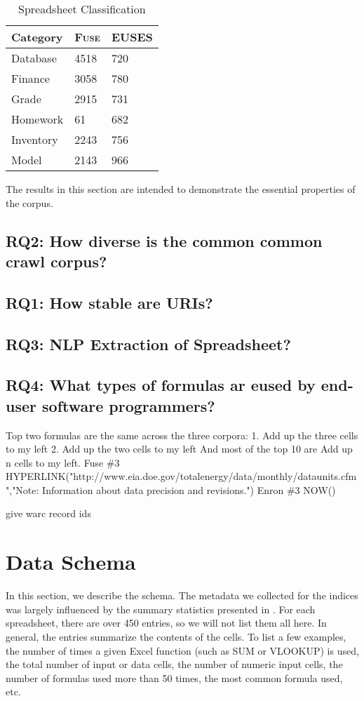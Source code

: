 \documentclass[conference]{IEEEtran}
\begin{document}
\begin{table}[!t]
\caption{Spreadsheet Classification\label{tab:ccrawl}}
\centering
\begin{tabular}{lll}
\toprule
\textbf{Category} & \textbf{\textsc{Fuse}} & \textbf{EUSES}\\
\midrule
Database & 4518 & 720\\
Finance & 3058 & 780\\
Grade & 2915 & 731\\
Homework & 61 & 682\\
Inventory & 2243 & 756\\
Model & 2143 & 966\\
\bottomrule
\end{tabular}
\end{table}

The results in this section are intended to demonstrate the essential properties of the corpus.

\subsection{RQ2: How diverse is the common common crawl corpus?}
\subsection{RQ1: How stable are URIs?}
\subsection{RQ3: NLP Extraction of Spreadsheet?}
\subsection{RQ4: What types of formulas ar eused by end-user software programmers?}


Top two formulas are the same across the three corpora: 
1. Add up the three cells to my left
2. Add up the two cells to my left
And most of the top 10 are Add up n cells to my left.
Fuse \#3 HYPERLINK("http://www.eia.doe.gov/totalenergy/data/monthly/dataunits.cfm","Note: Information about data precision and revisions.")
Enron \#3 NOW()  

give warc record ids


\section{Data Schema}
\label{sec:schema}
In this section, we describe the schema.
The metadata we collected for the indices was largely influenced by the summary statistics presented in \cite{Fisher2005}.  
For each spreadsheet, there are over 450 entries, so we will not list them all here.
In general, the entries summarize the contents of the cells.
To list a few examples, the number of times a given Excel function (such as SUM or VLOOKUP) is used, the total number of input or data cells, the number of numeric input cells, the number of formulas used more than 50 times, the most common formula used, etc.
\end{document}
